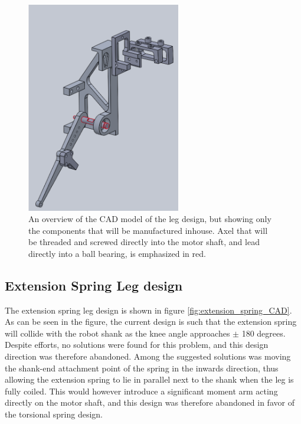 \begin{figure}[h!]
    \centering
    \includegraphics[width=0.6\textwidth]{Images/manufacture_only2.png}
    \caption{An overview of the CAD model of the leg design, but showing only the components that will be manufactured inhouse. Axel that will be threaded and screwed directly into the motor shaft, and lead directly into a ball bearing, is emphasized in red. }
    \label{fig:manufacture_only}
\end{figure}

\subsection{Extension Spring Leg design}
\label{sec:extension_spring_design}

The extension spring leg design is shown in figure \ref{fig:extension_spring_CAD}. As can be seen in the figure, the current design is such that the extension spring will collide with the robot shank as the knee angle approaches $\pm$ 180 degrees. Despite efforts, no solutions were found for this problem, and this design direction was therefore abandoned. Among the suggested solutions was moving the shank-end attachment point of the spring in the inwards direction, thus allowing the extension spring to lie in parallel next to the shank when the leg is fully coiled. This would however introduce a significant moment arm acting directly on the motor shaft, and this design was therefore abandoned in favor of the torsional spring design.

